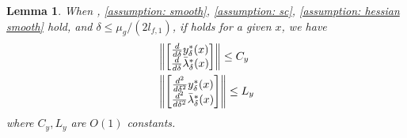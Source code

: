 \documentclass{article}
\newcommand{\nth}[1]{\left\| #1 \right\|}
\theoremstyle{plain}
\newtheorem{lemma}[theorem]{Lemma}
\theoremstyle{definition}
\theoremstyle{remark}
\begin{document}
\begin{lemma}\label{lemma: smooth of y*}
When , \ref{assumption: smooth}, \ref{assumption: sc}, \ref{assumption: hessian smooth} hold, and $\delta \leq \mu_g/(2l_{f,1})$, if  holds for a given $x$, we have
\begin{align*}
    &\nth{\begin{bmatrix}
        \frac{d}{d \delta} y^*_\delta(x) \\
        \frac{d}{d \delta} \Bar{\lambda}^*_\delta(x)
    \end{bmatrix}}\leq C_y\\
    &\nth{\begin{bmatrix}
        \frac{d^2}{d \delta^2} y^*_\delta(x) \\
        \frac{d^2}{d \delta^2} \Bar{\lambda}^*_\delta(x)
    \end{bmatrix}}\leq L_y
\end{align*}
where $C_y, L_y$ are $O(1)$ constants.
\end{lemma}
\end{document}
